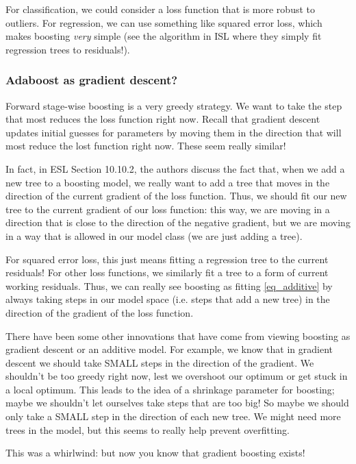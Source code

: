 For classification, we could consider a loss function that is more robust to outliers. For regression, we can use something like squared error loss, which makes boosting \emph{very} simple (see the algorithm in ISL where they simply fit regression trees to residuals!). 

\subsubsection{Adaboost as gradient descent?}

Forward stage-wise boosting is a very greedy strategy. We want to take the step that most reduces the loss function right now. Recall that gradient descent updates initial guesses for parameters by moving them in the direction that will most reduce the lost function right now. These seem really similar! 

In fact, in ESL Section 10.10.2, the authors discuss the fact that, when we add a new tree to a boosting model, we really want to add a tree that moves in the direction of the current gradient of the loss function. Thus, we should fit our new tree to the current gradient of our loss function: this way, we are moving in a direction that is close to the direction of the negative gradient, but we are moving in a way that is allowed in our model class (we are just adding a tree). 

For squared error loss, this just means fitting a regression tree to the current residuals! For other loss functions, we similarly fit a tree to a form of current working residuals. Thus, we can really see boosting as fitting \eqref{eq_additive} by always taking steps in our model space (i.e. steps that add a new tree) in the direction of the gradient of the loss function. 

There have been some other innovations that have come from viewing boosting as gradient descent or an additive model. For example, we know that in gradient descent we should take SMALL steps in the direction of the gradient. We shouldn't be too greedy right now, lest we overshoot our optimum or get stuck in a local optimum. This leads to the idea of a shrinkage parameter for boosting; maybe we shouldn't let ourselves take steps that are too big! So maybe we should only take a SMALL step in the direction of each new tree. We might need more trees in the model, but this seems to really help prevent overfitting. 

This was a whirlwind: but now you know that gradient boosting exists!